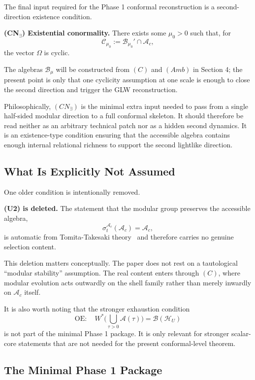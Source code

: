 \documentclass[12pt]{article}
\theoremstyle{definition}
\theoremstyle{remark}
\begin{document}
The final input required for the Phase 1 conformal reconstruction is a
second-direction existence condition.

\textbf{(CN\(_\exists\)) Existential conormality.}
There exists some \(\mu_0>0\) such that, for \[
\mathcal{C}_{\mu_0}:=\mathcal{B}_{\mu_0}'\cap \mathcal{A}_c,
\] the vector \(\Omega\) is cyclic.

The algebras \(\mathcal{B}_{\mu}\) will be constructed from \((C)\) and
\((Amb)\) in Section 4; the present point is only that one cyclicity
assumption at one scale is enough to close the second direction and
trigger the GLW reconstruction.

Philosophically, \((CN_\exists)\) is the minimal extra input needed to
pass from a single half-sided modular direction to a full conformal
skeleton. It should therefore be read neither as an arbitrary technical
patch nor as a hidden second dynamics. It is an existence-type condition
ensuring that the accessible algebra contains enough internal relational
richness to support the second lightlike direction.

\subsection{What Is Explicitly Not
Assumed}\label{what-is-explicitly-not-assumed}

One older condition is intentionally removed.

\textbf{(U2) is deleted.}
The statement that the modular group preserves the accessible algebra,
\[
\sigma_t^{\mathcal{A}_c}(\mathcal{A}_c)=\mathcal{A}_c,
\] is automatic from Tomita-Takesaki theory~\cite{Takesaki2003} and therefore carries no
genuine selection content.

This deletion matters conceptually. The paper does not rest on a
tautological ``modular stability'' assumption. The real content enters
through \((C)\), where modular evolution acts outwardly on the shell
family rather than merely inwardly on \(\mathcal{A}_c\) itself.

It is also worth noting that the stronger exhaustion condition \[
\mathrm{OE}: \quad W^*\!\Big(\bigcup_{\tau>0}\mathcal{A}(\tau)\Big)=\mathcal{B}(\mathcal{H}_U)
\] is not part of the minimal Phase 1 package. It is only relevant for
stronger scalar-core statements that are not needed for the present
conformal-level theorem.

\subsection{The Minimal Phase 1
Package}\label{the-minimal-phase-1-package}
\end{document}
